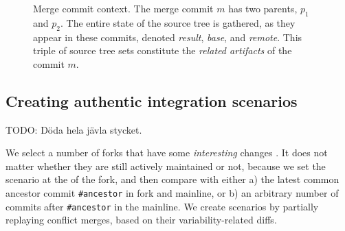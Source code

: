 \begin{figure}[h]
    \centering
    \caption{Merge commit context. The merge commit $m$ has two parents, $p_1$ and $p_2$. The entire state of the source tree is gathered, as they appear in these commits, denoted \textit{result}, \textit{base}, and \textit{remote}. This triple of source tree sets constitute the \textit{related artifacts} of the commit $m$.}
    \label{intentions:mergespace}
\end{figure}

\subsection{Creating authentic integration scenarios}
TODO: Döda hela jävla stycket.

We select a number of forks that have some \textit{interesting} changes \cite{stanciulescu2015}. It does not matter whether they are still actively maintained or not, because we set the scenario at the \head of the fork, and then compare with either a) the latest common ancestor commit \texttt{\#ancestor} in fork and mainline, or b) an arbitrary number of commits after \texttt{\#ancestor} in the mainline. We create scenarios by partially replaying conflict merges, based on their variability-related diffs.


